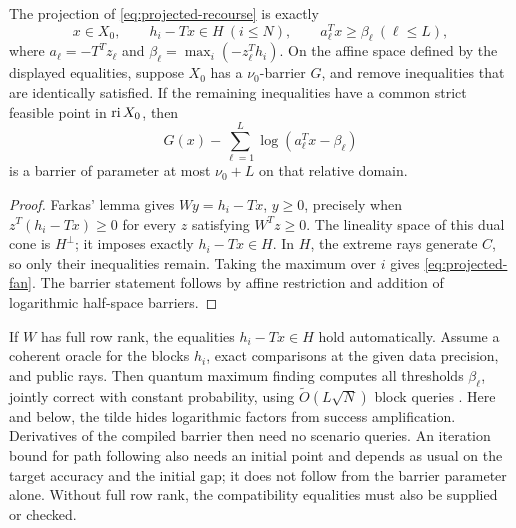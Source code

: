 \begin{proposition}\label{prop:projected-fan}
The projection of \eqref{eq:projected-recourse} is exactly
\begin{equation}\label{eq:projected-fan}
 x\in X_0,\qquad h_i-Tx\in H\ (i\leq N),\qquad
 a_\ell^Tx\geq\beta_\ell\ (\ell\leq L),
\end{equation}
where $a_\ell=-T^Tz_\ell$ and
$\beta_\ell=\max_i(-z_\ell^Th_i)$.
On the affine space defined by the displayed equalities, suppose $X_0$
has a $\nu_0$-barrier $G$, and remove inequalities that are identically
satisfied.  If the remaining inequalities have a common strict feasible
point in $\operatorname{ri} X_0$, then
\[
 G(x)-\sum_{\ell=1}^L\log(a_\ell^Tx-\beta_\ell)
\]
is a barrier of parameter at most $\nu_0+L$ on that relative domain.
\end{proposition}
\begin{proof}
Farkas' lemma gives $Wy=h_i-Tx$, $y\geq0$, precisely when
$z^T(h_i-Tx)\geq0$ for every $z$ satisfying $W^Tz\geq0$.
The lineality space of this dual cone is $H^\perp$; it imposes exactly
$h_i-Tx\in H$.  In $H$, the extreme rays generate $C$, so only their
inequalities remain.  Taking the maximum over $i$ gives
\eqref{eq:projected-fan}.  The barrier statement follows by affine
restriction and addition of logarithmic half-space barriers.
\end{proof}

If $W$ has full row rank, the equalities $h_i-Tx\in H$ hold
automatically.  Assume a coherent oracle for the blocks $h_i$, exact
comparisons at the given data precision, and public rays.  Then
quantum maximum finding computes all thresholds $\beta_\ell$, jointly
correct with constant probability, using
$\widetilde O(L\sqrt N)$ block queries
\citep{DurrHoyer1996}.  Here and below, the tilde hides logarithmic
factors from success amplification.  Derivatives of the compiled barrier then need no scenario
queries.  An iteration bound for path following also needs an initial
point and depends as usual on the target accuracy and the initial gap;
it does not follow from the barrier parameter alone.  Without full row
rank, the compatibility equalities must also be supplied or checked.

